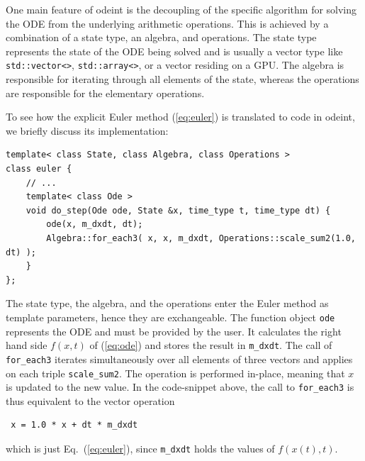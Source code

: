 \documentclass[final]{siamltex}
\newcommand{\code}[1]{\lstinline|#1|}
\newcommand{\eqref}[1]{(\ref{#1})}
\begin{document}
One main feature of odeint is the decoupling of the specific algorithm
for solving the ODE from the underlying arithmetic operations. This
is achieved by a combination of a state type, an algebra, and
operations. The state type represents the state of the ODE being
solved and is usually a vector type like \code{std::vector<>},
\code{std::array<>}, or a vector residing on a GPU. The algebra is
responsible for iterating through all elements of the state, whereas
the operations are responsible for the elementary operations.

To see how the explicit Euler method \eqref{eq:euler} is translated to
code in odeint, we briefly discuss its implementation:
\begin{lstlisting}
template< class State, class Algebra, class Operations >
class euler {
    // ...
    template< class Ode >
    void do_step(Ode ode, State &x, time_type t, time_type dt) {
        ode(x, m_dxdt, dt);
        Algebra::for_each3( x, x, m_dxdt, Operations::scale_sum2(1.0, dt) );
    }
};
\end{lstlisting}
The state type, the algebra, and the operations enter the Euler method
as template parameters, hence they are exchangeable. The function
object \code{ode} represents the ODE and must be provided by the
user. It calculates the right hand side $f(x,t)$ of \eqref{eq:ode} and
stores the result in \code{m_dxdt}.  The call of \code{for_each3}
iterates simultaneously over all elements of three vectors and applies
on each triple \code{scale_sum2}. The operation is performed in-place,
meaning that $x$ is updated to the new value.  In the code-snippet
above, the call to \code{for_each3} is thus equivalent to the vector
operation
\begin{lstlisting}
 x = 1.0 * x + dt * m_dxdt
\end{lstlisting}
which is just Eq.~\eqref{eq:euler}, since \code{m_dxdt} holds the values of
$f(x(t), t)$.
\end{document}

